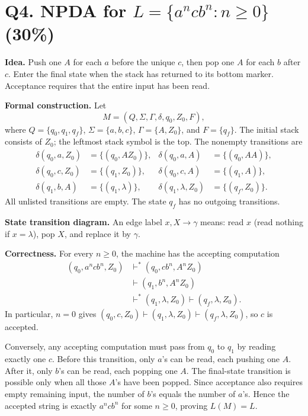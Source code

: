 \documentclass[11pt,a4paper]{article}
\begin{document}
\newpage
\section*{Q4. NPDA for $L=\{a^ncb^n:n\ge0\}$ (30\%)}
\textbf{Idea.}
Push one $A$ for each $a$ before the unique $c$, then pop one $A$ for
each $b$ after $c$. Enter the final state when the stack has returned
to its bottom marker. Acceptance requires that the entire input has been read.

\textbf{Formal construction.}
Let
\[
M=(Q,\Sigma,\Gamma,\delta,q_0,Z_0,F),
\]
where $Q=\{q_0,q_1,q_f\}$, $\Sigma=\{a,b,c\}$,
$\Gamma=\{A,Z_0\}$, and $F=\{q_f\}$.
The initial stack consists of $Z_0$; the leftmost stack symbol is the top.
The nonempty transitions are
\[
\begin{aligned}
\delta(q_0,a,Z_0)&=\{(q_0,AZ_0)\}, &
\delta(q_0,a,A)&=\{(q_0,AA)\},\\
\delta(q_0,c,Z_0)&=\{(q_1,Z_0)\}, &
\delta(q_0,c,A)&=\{(q_1,A)\},\\
\delta(q_1,b,A)&=\{(q_1,\lambda)\}, &
\delta(q_1,\lambda,Z_0)&=\{(q_f,Z_0)\}.
\end{aligned}
\]
All unlisted transitions are empty. The state $q_f$ has no outgoing transitions.

\textbf{State transition diagram.}
An edge label $x,X\to\gamma$ means: read $x$ (read nothing if
$x=\lambda$), pop $X$, and replace it by $\gamma$.
\begin{center}
\end{center}

\textbf{Correctness.}
For every $n\ge0$, the machine has the accepting computation
\[
\begin{aligned}
(q_0,a^ncb^n,Z_0)
&\vdash^{*}(q_0,cb^n,A^nZ_0)\\
&\vdash(q_1,b^n,A^nZ_0)\\
&\vdash^{*}(q_1,\lambda,Z_0)
\vdash(q_f,\lambda,Z_0).
\end{aligned}
\]
In particular, $n=0$ gives
$(q_0,c,Z_0)\vdash(q_1,\lambda,Z_0)\vdash(q_f,\lambda,Z_0)$,
so $c$ is accepted.

Conversely, any accepting computation must pass from $q_0$ to $q_1$
by reading exactly one $c$. Before this transition, only $a$'s can be read,
each pushing one $A$. After it, only $b$'s can be read, each popping one
$A$. The final-state transition is possible only when all those $A$'s
have been popped. Since acceptance also requires empty remaining input,
the number of $b$'s equals the number of $a$'s. Hence the accepted string
is exactly $a^ncb^n$ for some $n\ge0$, proving $L(M)=L$.
\end{document}

